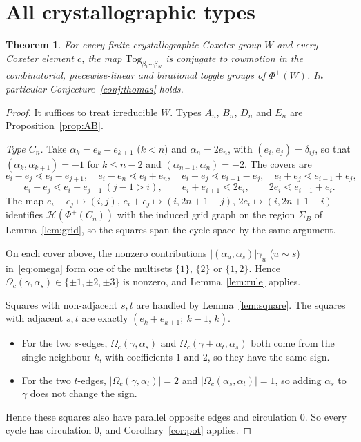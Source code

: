 \documentclass[11pt]{amsart}
\newtheorem{theorem}{Theorem}[section]
\theoremstyle{definition}
\newcommand{\Tog}{\mathrm{Tog}}
\newcommand{\Hasse}{\mathcal H}
\begin{document}
\section{All crystallographic types}\label{sec:all}
\begin{theorem}\label{thm:thomas}
For every finite crystallographic Coxeter group $W$ and every Coxeter element $c$, the map $\Tog_{\beta_1\cdots\beta_N}$ is conjugate to rowmotion in the combinatorial, piecewise-linear and birational toggle groups of $\Phi^+(W)$. In particular Conjecture~\ref{conj:thomas} holds.
\end{theorem}

\begin{proof}
It suffices to treat irreducible $W$. Types $A_n$, $B_n$, $D_n$ and $E_n$ are Proposition~\ref{prop:AB}.

\emph{Type $C_n$.} Take $\alpha_k=e_k-e_{k+1}$ ($k<n$) and $\alpha_n=2e_n$, with $(e_i,e_j)=\delta_{ij}$, so that $(\alpha_k,\alpha_{k+1})=-1$ for $k\le n-2$ and $(\alpha_{n-1},\alpha_n)=-2$. The covers are
\[e_i-e_j\lessdot e_i-e_{j+1},\quad e_i-e_n\lessdot e_i+e_n,\quad e_i-e_j\lessdot e_{i-1}-e_j,\quad e_i+e_j\lessdot e_{i-1}+e_j,\]
\[e_i+e_j\lessdot e_i+e_{j-1}\ (j-1>i),\qquad e_i+e_{i+1}\lessdot 2e_i,\qquad 2e_i\lessdot e_{i-1}+e_i .\]
The map $e_i-e_j\mapsto(i,j)$, $e_i+e_j\mapsto(i,2n+1-j)$, $2e_i\mapsto(i,2n+1-i)$ identifies $\Hasse(\Phi^+(C_n))$ with the induced grid graph on the region $\Sigma_B$ of Lemma~\ref{lem:grid}, so the squares span the cycle space by the same argument.

On each cover above, the nonzero contributions $|(\alpha_u,\alpha_s)|\gamma_u$ ($u\sim s$) in~\eqref{eq:omega} form one of the multisets $\{1\}$, $\{2\}$ or $\{1,2\}$. Hence $\Omega_c(\gamma,\alpha_s)\in\{\pm1,\pm2,\pm3\}$ is nonzero, and Lemma~\ref{lem:rule} applies.

Squares with non-adjacent $s,t$ are handled by Lemma~\ref{lem:square}. The squares with adjacent $s,t$ are exactly $(e_k+e_{k+1};\ k-1,\,k)$.
\begin{itemize}
\item For the two $s$-edges, $\Omega_c(\gamma,\alpha_s)$ and $\Omega_c(\gamma+\alpha_t,\alpha_s)$ both come from the single neighbour $k$, with coefficients $1$ and $2$, so they have the same sign.
\item For the two $t$-edges, $|\Omega_c(\gamma,\alpha_t)|=2$ and $|\Omega_c(\alpha_s,\alpha_t)|=1$, so adding $\alpha_s$ to $\gamma$ does not change the sign.
\end{itemize}
Hence these squares also have parallel opposite edges and circulation $0$. So every cycle has circulation $0$, and Corollary~\ref{cor:pot} applies.


\end{proof}
\end{document}

